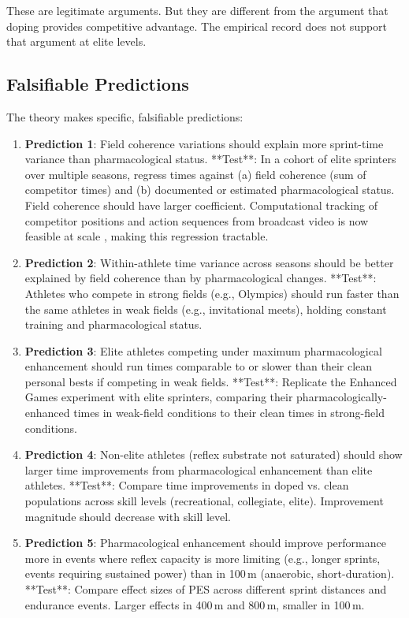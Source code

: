 \documentclass[11pt,twocolumn]{article}
\theoremstyle{definition}
\theoremstyle{remark}
\begin{document}
These are legitimate arguments. But they are different from the argument that doping provides competitive advantage. The empirical record does not support that argument at elite levels.

\subsection{Falsifiable Predictions}

The theory makes specific, falsifiable predictions:

\begin{enumerate}[leftmargin=1.2em]
\item \textbf{Prediction 1}: Field coherence variations should explain more sprint-time variance than pharmacological status. **Test**: In a cohort of elite sprinters over multiple seasons, regress times against (a) field coherence (sum of competitor times) and (b) documented or estimated pharmacological status. Field coherence should have larger coefficient. Computational tracking of competitor positions and action sequences from broadcast video is now feasible at scale \cite{fernandez2018wider,decroos2019actions,theagarajan2021tracklet,dorazio2009markov}, making this regression tractable.

\item \textbf{Prediction 2}: Within-athlete time variance across seasons should be better explained by field coherence than by pharmacological changes. **Test**: Athletes who compete in strong fields (e.g., Olympics) should run faster than the same athletes in weak fields (e.g., invitational meets), holding constant training and pharmacological status.

\item \textbf{Prediction 3}: Elite athletes competing under maximum pharmacological enhancement should run times comparable to or slower than their clean personal bests if competing in weak fields. **Test**: Replicate the Enhanced Games experiment with elite sprinters, comparing their pharmacologically-enhanced times in weak-field conditions to their clean times in strong-field conditions.

\item \textbf{Prediction 4}: Non-elite athletes (reflex substrate not saturated) should show larger time improvements from pharmacological enhancement than elite athletes. **Test**: Compare time improvements in doped vs. clean populations across skill levels (recreational, collegiate, elite). Improvement magnitude should decrease with skill level.

\item \textbf{Prediction 5}: Pharmacological enhancement should improve performance more in events where reflex capacity is more limiting (e.g., longer sprints, events requiring sustained power) than in 100\,m (anaerobic, short-duration). **Test**: Compare effect sizes of PES across different sprint distances and endurance events. Larger effects in 400\,m and 800\,m, smaller in 100\,m.
\end{enumerate}
\end{document}
